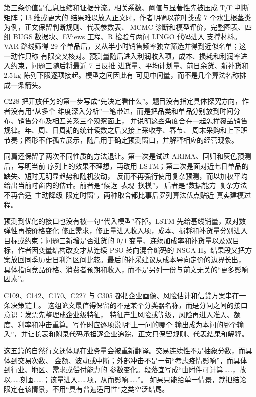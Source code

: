 第三条价值是信息压缩和证据分流。相关系数、阈值与显著性先被压成 T/F 判断矩阵；13 维或更大的
结果难以放入正文时，作者明确以花叶类或 7 个水生根茎类为例，正文保留判断规则、代表参数表、
MCMC 诊断和模型评价，完整图表、四组 BUGS 数据块、EViews 工程、R 检验与两问 LINGO 代码进入
支撑材料。VAR 路线筛得 29 个单品后，又从半小时销售频率独立筛选并得到近似名单；这一动作只称
有限交叉核对。预测量随后进入利润收入项，成本、损耗和利润率进入约束，问题三随后将最近 7 日反推
进货量、平均计划量、前日余货、新补货和 $2.5\,\mathrm{kg}$ 陈列下限逐项接起。模型之间因此有
可见中间量，而不是几个算法名称排成一条箭头。

C228 把开放任务的第一步写成“先决定看什么”。题目没有指定具体探究方向，作者没有用“从多个
维度深入分析”一笔带过，而是把品类和单品分别放到时间分布、销售分布及相互关系三个观察面上，
并说明这些角度合在一起怎样覆盖销售规律。年、周、日周期的统计读数之后又接上采收季、春节、
周末采购和上下班节奏；图形不作孤立展示，随后用于确定预测窗口，并解释相应的经营现象。

同篇还保留了两次不同性质的方法退让。第一次是试过 ARIMA、回归和灰色预测后，写明当前
序列上的效果不理想，再改用 LSTM；第二次是面对近七日单品的缺失、短时无明显趋势和随机波动，
反而不再强行使用复杂预测，而以加权平均给出当前时窗内的估计。前者是“候选--表现--换模”，
后者是“数据能力--复杂方法不再合适--主动降级--限定时窗”，两种取舍都比事后罗列算法优点贴近
真实建模过程。

预测到优化的接口也没有被一句“代入模型”吞掉。LSTM 先给基线销量，双对数弹性再按价格变化
修正需求，修正量进入收入项，成本、损耗和补货量分别进入目标或约束；问题三新增是否进货的
$0/1$ 变量、连续加成率和补货量以及双目标，作者因变量结构改变才从连续 PSO 转向混合编码的
NSGA-II。结果段又把方案放回同季历史日利润区间比较。最后的补采建议从成本导向定价的边界长出，
具体指向竞品价格、消费者预期和收入，而不是另列一份与前文无关的“更多影响因素”。

C109、C142、C170、C227 与 C305 都把企业画像、风险估计和信贷方案串在一条决策链上。
这组论文最值得保留的不是某个分类器名称，而是分问之间的接口意识：发票先整理成企业级特征，
特征产生风险或等级，风险再进入准入、额度、利率和冲击重算。写作时应逐项说明“上一问的哪个
输出成为本问的哪个输入”，并让长表和附录代码承担逐企业追踪，正文只保留规则、代表结果和解释。

这五篇的自然行文还体现在业务量会被重新翻译。交易连续性不是抽象分数，而具体到交易次数、
金额、波动或中断；外部冲击不是一句“考虑疫情影响”，而具体到行业、地区、需求或偿付能力的
参数变化。段落宜写成“由附件可计算……，故以……刻画……；该量进入……项，从而影响……”。
如果只能给单一情景，就把结论限定在该情景，不用“具有普遍适用性”之类空泛结尾。

